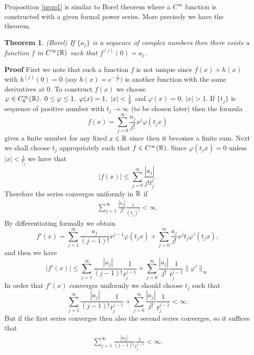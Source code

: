 \documentclass[12pt,reqno]{amsart}
\theoremstyle{plain}  %
\newtheorem{theorem}{Theorem}
\theoremstyle{definition}
\newcommand{\nin}{\noindent}
\newcommand{\vph}{\varphi}
\begin{document}
\vskip0.1in
\nin
Proposition \ref{prop1} is similar to Borel theorem where a $ C^\infty $ function
is constructed with a given formal power series.  More precisely we
have the theorem.
\medskip
\begin{theorem}(Borel)  If $ \{a_j\} $ is a sequence of complex
numbers then there exists a function $ f $ in $ C^\infty (\Bbb R) $ such
that $ f^{(j)} (0) = a_j$.
\end{theorem}
\vskip0.1in
\nin
{\bf Proof}  First we note that such a function $ f $ is not unique
since $ f(x) + h(x) $ with $ h^{(j)} (0) = 0 $ (say $ h(x) = e^{-
\frac{1}{x^2}}) $  is another function with the same derivatives at 0.  To
construct $ f(x) $ we choose $ \vph \in C^\infty_0 (\Bbb R), \ 0 \le \vph \le
1, \ \vph (x) = 1, \ |x| < \frac{1}{2} $ and $ \vph (x) = 0, \ |x| > 1$.
If $ \{t_j\} $ is sequence of positive number with $ t_j \longrightarrow
\infty $ (to be chosen later) then the formula
$$f(x) = \sum^\infty_{j=0} \frac{a_j}{j!} x^j \vph (t_j x) $$
gives a finite number for any fixed $ x \in \Bbb R $ since then it
becomes a finite sum.  Next we shall choose $ t_j $ appropriately such
that $ f \in C^\infty (\Bbb R)$.  Since $ \vph (t_j x) = 0 $ unless $ |x| <
\frac{1}{t_j} $ we have that
$$|f(x)| \le \sum^\infty_{j=0} \frac{|a_j|}{j!t_j^j}. $$
Therefore the series converges uniformly in $ \Bbb R $ if 
\begin{equation}
	\begin{split}
		\sum^\infty_{j=1} \frac{|a_j| }{j!}
 \frac{1}{(t_j)^j} <\infty.
		\label{0a}
	\end{split}
\end{equation}
By differentiating formally we obtain
$$
f'(x) = \sum^\infty_{j=1} \frac{a_j}{(j-1)!} x^{j-1} \vph(t_jx) +
\sum^\infty_{j=0} \frac{a_j}{j!} x^j  t_j \vph '(t_jx),
$$
and  then we have
$$
|f'(x)|\le \sum^\infty_{j=1} \frac{|a_j|}{(j-1)!} \frac{1}{t_j^{j-1}} +
\sum^\infty_{j=0} \frac{|a_j|}{j!} \frac{1}{t_j^{j-1}} \|\vph'\|_\infty
$$
In order that $f'(x)$ converges uniformly we should choose $t_j$ such that
$$\sum^\infty_{j=1} \frac{|a_j|}{(j-1)!} \frac{1}{t_j^{j-1}} +
 \sum^\infty_{j=0} \frac{|a_j|}{j!} \frac{1}{t_j^{j-1}} < \infty.$$
\smallskip
\nin
But if the first series converges then also the second
 series converges, so it suffices that
 \begin{equation}
	 \begin{split}
		  \sum^\infty_{j=1} \frac{|a_j|}{(j-1)!}
\frac{1}{t_j^{j-1}} < \infty.
		 \label{1a}
	 \end{split}
 \end{equation}
\end{document}
